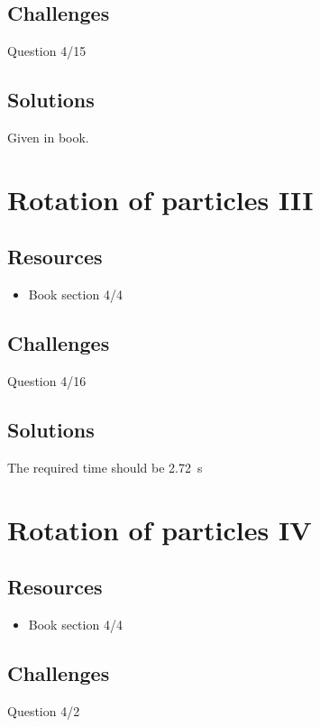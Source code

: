 \subsection*{Challenges}
Question 4/15

\subsection*{Solutions}
Given in book.




\newpage
\section{Rotation of particles III}

\subsection*{Resources}
\begin{itemize}
    \item Book section 4/4
\end{itemize}

\subsection*{Challenges}
Question 4/16

\subsection*{Solutions}
The required time should be \SI{2.72}{s}




\newpage
\section{Rotation of particles IV}

\subsection*{Resources}
\begin{itemize}
    \item Book section 4/4
\end{itemize}

\subsection*{Challenges}
Question 4/2

